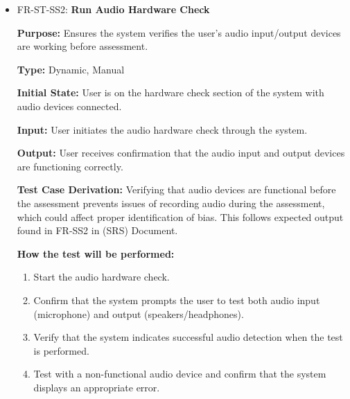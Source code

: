 \documentclass[12pt, titlepage]{article}
\begin{document}
\begin{itemize}
  \item FR-ST-SS2: \textbf{Run Audio Hardware Check}
  \begin{mdframed}[linewidth=0.5mm]
      \textbf{Purpose:} Ensures the system verifies the user's audio input/output devices are working before assessment. \par
      \textbf{Type:} Dynamic, Manual \par
      \textbf{Initial State:} User is on the hardware check section of the system with audio devices connected. \par
      \textbf{Input:} User initiates the audio hardware check through the system. \par
      \textbf{Output:} User receives confirmation that the audio input and output devices are functioning correctly. \par
      \textbf{Test Case Derivation:} Verifying that audio devices are functional before the assessment prevents issues of recording audio during
      the assessment, which could affect proper identification of bias. This follows expected output found in FR-SS2 in (SRS) Document. \par
      \textbf{How the test will be performed:}
      \begin{enumerate}[noitemsep]
        \item Start the audio hardware check.
        \item Confirm that the system prompts the user to test both audio input \\ (microphone) and output (speakers/headphones).
        \item Verify that the system indicates successful audio detection when the test is performed.
        \item Test with a non-functional audio device and confirm that the system displays an appropriate error.
      \end{enumerate}
  \end{mdframed}


\end{itemize}
\end{document}
